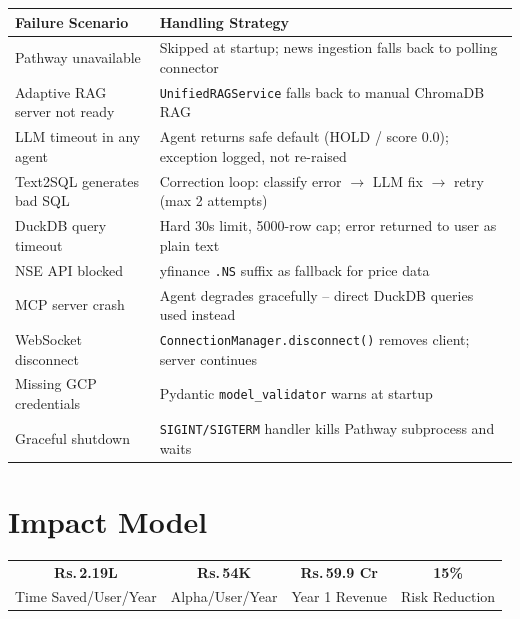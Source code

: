 \documentclass[11pt, a4paper]{article}
\newcommand{\Rs}{Rs.\,}
\begin{document}
\begin{center}
\small
\begin{tabular}{L{4cm} L{9.5cm}}
  \toprule
  \textbf{Failure Scenario} & \textbf{Handling Strategy} \\
  \midrule
  Pathway unavailable & Skipped at startup; news ingestion falls back to polling connector \\[3pt]
  Adaptive RAG server not ready & \texttt{UnifiedRAGService} falls back to manual ChromaDB RAG \\[3pt]
  LLM timeout in any agent & Agent returns safe default (HOLD / score 0.0); exception logged, not re-raised \\[3pt]
  Text2SQL generates bad SQL & Correction loop: classify error $\to$ LLM fix $\to$ retry (max 2 attempts) \\[3pt]
  DuckDB query timeout & Hard 30s limit, 5000-row cap; error returned to user as plain text \\[3pt]
  NSE API blocked & yfinance \texttt{.NS} suffix as fallback for price data \\[3pt]
  MCP server crash & Agent degrades gracefully -- direct DuckDB queries used instead \\[3pt]
  WebSocket disconnect & \texttt{ConnectionManager.disconnect()} removes client; server continues \\[3pt]
  Missing GCP credentials & Pydantic \texttt{model\_validator} warns at startup \\[3pt]
  Graceful shutdown & \texttt{SIGINT/SIGTERM} handler kills Pathway subprocess and waits \\
  \bottomrule
\end{tabular}
\end{center}

\newpage


\section{Impact Model}

\begin{keymetricbox}
\centering
\begin{tabular}{cccc}
  {\LARGE\bfseries\color{navy}\Rs{}2.19L} &
  {\LARGE\bfseries\color{green}\Rs{}54K} &
  {\LARGE\bfseries\color{orange}\Rs{}59.9 Cr} &
  {\LARGE\bfseries\color{purple}15\%} \\[3pt]
  {\scriptsize\color{steel}Time Saved/User/Year} &
  {\scriptsize\color{steel}Alpha/User/Year} &
  {\scriptsize\color{steel}Year 1 Revenue} &
  {\scriptsize\color{steel}Risk Reduction}
\end{tabular}
\end{keymetricbox}
\end{document}
